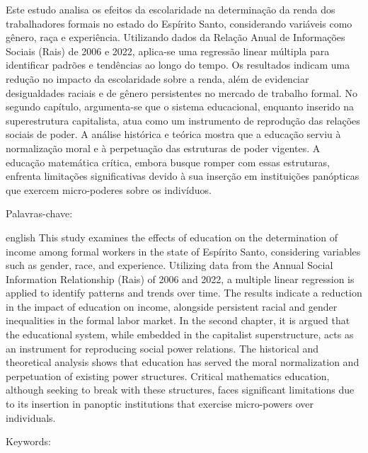 \begin{resumo}
  \vspace{-15pt}
  
  Este estudo analisa os efeitos da escolaridade na determinação da renda dos trabalhadores formais no estado do Espírito Santo, considerando variáveis como gênero, raça e experiência. Utilizando dados da Relação Anual de Informações Sociais (Rais) de 2006 e 2022, aplica-se uma regressão linear múltipla para identificar padrões e tendências ao longo do tempo. Os resultados indicam uma redução no impacto da escolaridade sobre a renda, além de evidenciar desigualdades raciais e de gênero persistentes no mercado de trabalho formal. No segundo capítulo, argumenta-se que o sistema educacional, enquanto inserido na superestrutura capitalista, atua como um instrumento de reprodução das relações sociais de poder. A análise histórica e teórica mostra que a educação serviu à normalização moral e à perpetuação das estruturas de poder vigentes. A educação matemática crítica, embora busque romper com essas estruturas, enfrenta limitações significativas devido à sua inserção em instituições panópticas que exercem micro-poderes sobre os indivíduos.

  Palavras-chave: \palavraschaveemlinha
\end{resumo}


\begin{resumo}[Abstract]
  \vspace{-15pt}
  
  \begin{otherlanguage*}{english}
    This study examines the effects of education on the determination of income among formal workers in the state of Espírito Santo, considering variables such as gender, race, and experience. Utilizing data from the Annual Social Information Relationship (Rais) of 2006 and 2022, a multiple linear regression is applied to identify patterns and trends over time. The results indicate a reduction in the impact of education on income, alongside persistent racial and gender inequalities in the formal labor market. In the second chapter, it is argued that the educational system, while embedded in the capitalist superstructure, acts as an instrument for reproducing social power relations. The historical and theoretical analysis shows that education has served the moral normalization and perpetuation of existing power structures. Critical mathematics education, although seeking to break with these structures, faces significant limitations due to its insertion in panoptic institutions that exercise micro-powers over individuals.
  
  Keywords: \inlinekeywords
\end{otherlanguage*}
\end{resumo}